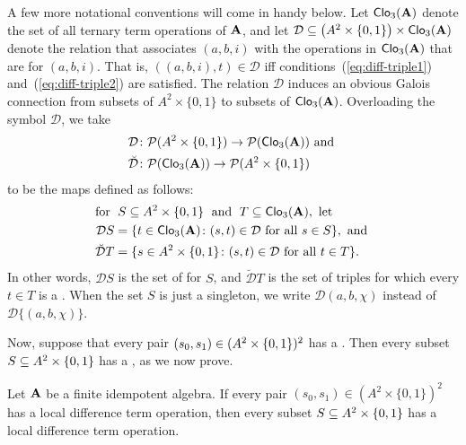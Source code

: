 
\newcommand\dtrel{\ensuremath{\mathrel{\mathcal{D}}}}
\newcommand\dtr{\ensuremath{\mathcal{D}}}
A few more notational conventions will come in handy below.
Let $\operatorname{\mathsf{Clo}}_3(\mathbf{A})$ denote the set of all ternary term operations of $\mathbf{A}$,
and let
$\dtr \subseteq \bigl(A^2\times \{0,1\}\bigr) \times \Clo_3(\alg{A})$
denote the relation that associates $(a, b, i)$
with the operations in $\operatorname{\mathsf{Clo}}_3(\mathbf{A})$ that are \ldtos for
$(a, b, i)$.  That is,
$((a,b,i), t) \in \dtr$ iff conditions~(\ref{eq:diff-triple1})
and~(\ref{eq:diff-triple2}) are satisfied.
The relation $\dtr$ induces an obvious Galois connection
from subsets of $A^2\times \{0,1\}$ to subsets
of $\operatorname{\mathsf{Clo}}_3(\mathbf{A})$.  Overloading the symbol $\dtr$,
we take
\begin{align*}
\dtr &\colon \sP(A^2 \times \{0,1\}) \to \sP(\Clo_3(\alg{A})) \text{ and }\\
\breve{\dtr} &\colon \sP(\Clo_3(\alg{A})) \to \sP(A^2\times \{0,1\})
\end{align*}
to be the maps defined as follows:
\begin{align*}
  \text{for }& \;  S \subseteq A^2 \times \{0,1\}\; \text{ and } \;T \subseteq \Clo_3(\alg{A}),
  \text{ let }\\
  \dtr S &= \{t \in \Clo_3(\alg{A}) \colon (s,t) \in \dtr \text{ for all } s \in S\}, \text{ and }\\
  \breve{\dtr} T &= \{s \in A^2 \times \{0,1\} \colon (s,t) \in \dtr \text{ for all } t \in T\}.
\end{align*}
In other words, $\dtr S$ is the set of \ldtos
for $S$, and $\breve{\dtr} T$ is the set of triples for which every $t\in T$
is a \ldto.  When the set $S$ is just a singleton, we write
$\dtr (a,b,\chi)$ instead of $\dtr \{(a,b,\chi)\}$.

Now, suppose that every pair
$(s_0, s_1)\in (A^2 \times \{0,1\})^2$ %
has a \ldto.
Then every subset $S\subseteq A^2 \times \{0,1\}$
has a \ldto, as we now prove.

\begin{theorem} %
  \label{thm:local-diff-terms}
  Let
  $\mathbf{A}$ be a finite idempotent algebra. %
  If every pair
  $(s_0, s_1) \in (A^2 \times \{0,1\})^2$
  has a local difference term operation, then
  every subset $S \subseteq A^2 \times \{0,1\}$
  has a local difference term operation.
\end{theorem}



